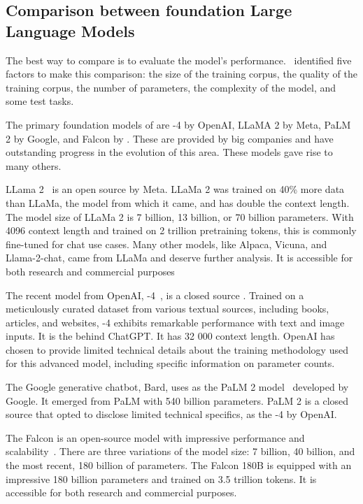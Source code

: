 \subsection{Comparison between foundation Large Language Models}

The best way to compare {\llm} is to evaluate the model's performance.~\citet{hadi_LLM_2023} identified five factors to make this comparison: the size of the training corpus, the quality of the training corpus, the number of parameters, the complexity of the model, and some test tasks.

The primary foundation models of {\llm} are {\gpt}-4 by OpenAI, LLaMA 2 by Meta, PaLM 2 by Google, and Falcon by {\tii}. These {\llm} are provided by big companies and have outstanding progress in the evolution of this area. These models gave rise to many others.

LLama 2~\cite{touvron_llama_2023} is an open source {\llm} by Meta. LLaMa 2 was trained on 40\% more data than LLaMa, the model from which it came, and has double the context length. The model size of LLaMa 2 is 7 billion, 13 billion, or 70 billion parameters. With 4096 context length and trained on 2 trillion pretraining tokens, this {\llm} is commonly fine-tuned for chat use cases. Many other models, like Alpaca, Vicuna, and Llama-2-chat, came from LLaMa and deserve further analysis. It is accessible for both research and commercial purposes

The recent {\gpt} model from OpenAI, {\gpt}-4~\cite{openai_gpt-4_2023}, is a closed source {\llm}. Trained on a meticulously curated dataset from various textual sources, including books, articles, and websites, {\gpt}-4 exhibits remarkable performance with text and image inputs. It is the {\llm} behind ChatGPT. It has 32 000 context length. OpenAI has chosen to provide limited technical details about the training methodology used for this advanced model, including specific information on parameter counts.

The Google generative chatbot, Bard, uses as {\llm} the PaLM 2 model~\cite{anil_palm_2023} developed by Google. It emerged from PaLM with 540 billion parameters. PaLM 2 is a closed source {\llm} that opted to disclose limited technical specifics, as the {\gpt}-4 by OpenAI. 

The Falcon {\llm} is an open-source model with impressive performance and scalability~\cite{almazrouei_falcon_2023}. There are three variations of the model size: 7 billion, 40 billion, and the most recent, 180 billion of parameters. The Falcon 180B is equipped with an impressive 180 billion parameters and trained on 3.5 trillion tokens. It is accessible for both research and commercial purposes.

